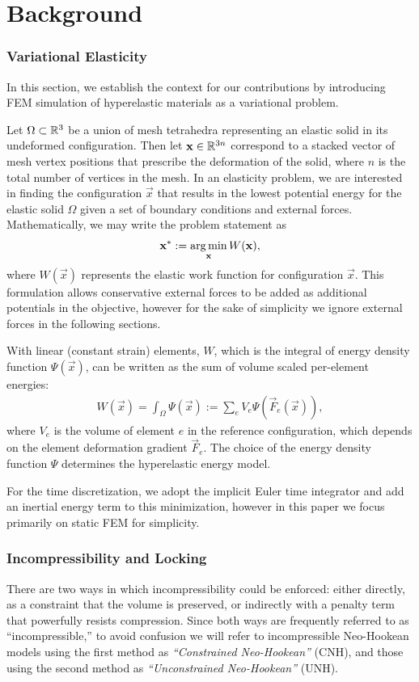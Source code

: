 \chapter{Background}
\label{ch:Background}

\subsection{Variational Elasticity}
In this section, we establish the context for our contributions by introducing FEM simulation of
hyperelastic materials as a variational problem.

Let $\Omega \subset \mathbb{R}^{3}$ be a union of mesh tetrahedra representing an elastic solid in its
undeformed configuration. Then let $\mathbf{x} \in \mathbb{R}^{3n}$ correspond to a stacked vector of mesh vertex
positions that prescribe the deformation of the solid, where $n$ is the total number of vertices
in the mesh. In an elasticity problem, we are
interested in finding the configuration $\vec{x}$ that results in the lowest potential energy
for the elastic solid $\Omega$ given a set of boundary conditions
and external forces. Mathematically, we may write the problem statement as
\begin{align}
\mathbf{x}^* := \operatorname*{arg\,min}_{\mathbf{x}} W(\mathbf{x}),
\label{eq:energy_min}
\end{align}
where $W(\vec{x})$ represents the elastic work function for configuration $\vec{x}$. 
This formulation allows conservative external forces to be added as additional potentials in the
objective, however for the sake of simplicity we ignore external forces in the following sections.

With linear (constant strain) elements, $W$, which is the integral of energy density function $\Psi(\vec{x})$, can be written as the sum of volume scaled per-element energies:
\begin{align}
W(\vec{x}) = \int_{\Omega} \Psi(\vec{x}) := \sum_{e} V_{e} \Psi(\vec{F}_e(\vec{x})),
\label{eq:total_energy}
\end{align}
where $V_e$ is the volume of element $e$ in the reference configuration, which depends on the element deformation gradient $\vec{F}_e$.  The choice of the energy density function $\Psi$ determines the hyperelastic energy model. 

For the time discretization, we adopt the implicit Euler time integrator and add an inertial
energy term to this minimization, however in this paper we focus primarily on static FEM for
simplicity. 

\subsection{Incompressibility and Locking}
There are two ways in which incompressibility could be enforced: either directly, as a constraint that the volume is preserved, or indirectly with a penalty term that powerfully resists compression. Since both ways are frequently referred to as ``incompressible,'' to avoid confusion we will refer to incompressible Neo-Hookean models using the first method as {\em ``Constrained Neo-Hookean''} (CNH), and those using the second method as
{\em ``Unconstrained Neo-Hookean''} (UNH).

